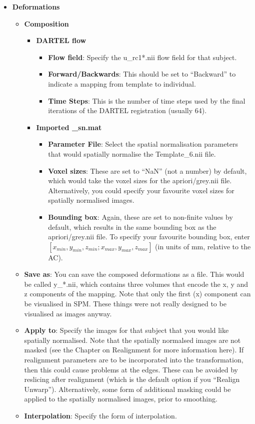 \begin{itemize}
\item{{\bf Deformations}
  \begin{itemize}
  \item{{\bf Composition}
    \begin{itemize}
    \item{{\bf DARTEL flow}
      \begin{itemize}
      \item{{\bf Flow field}: Specify the u\_rc1*.nii flow field for that subject.}
      \item{{\bf Forward/Backwards}: This should be set to ``Backward'' to indicate a mapping from template to individual.}
      \item{{\bf Time Steps}: This is the number of time steps used by the final iterations of the DARTEL registration (usually 64).}
      \end{itemize}
    }
    \item{{\bf Imported \_sn.mat}
      \begin{itemize}
      \item{{\bf Parameter File}: Select the spatial normalisation parameters that would spatially normalise the Template\_6.nii file.}
      \item{{\bf Voxel sizes}: These are set to ``NaN'' (not a number) by default, which would take the voxel sizes for the apriori/grey.nii file.  Alternatively, you could specify your favourite voxel sizes for spatially normalised images.}
      \item{{\bf Bounding box}: Again, these are set to non-finite values by default, which results in the same bounding box as the apriori/grey.nii file.  To specify your favourite bounding box, enter $[x_{min}, y_{min}, z_{min}; x_{max}, y_{max}, z_{max}]$ (in units of mm, relative to the AC).}
      \end{itemize}
    }
    \end{itemize}
  }
  \item{{\bf Save as}: You can save the composed deformations as a file. This would be called y\_*.nii, which contains three volumes that encode the x, y and z components of the mapping.  Note that only the first (x) component can be visualised in SPM. These things were not really designed to be visualised as images anyway.}
  \item{{\bf Apply to}: Specify the images for that subject that you would like spatially normalised. Note that the spatially normalsed images are not masked (see the Chapter on Realignment for more information here).  If realignment parameters are to be incorporated into the transformation, then this could cause problems at the edges.  These can be avoided by reslicing after realignment (which is the default option if you ``Realign Unwarp'').  Alternatively, some form of additional masking  could be applied to the spatially normalised images, prior to smoothing.}
  \item{{\bf Interpolation}: Specify the form of interpolation.}
  \end{itemize}
}
\end{itemize}

